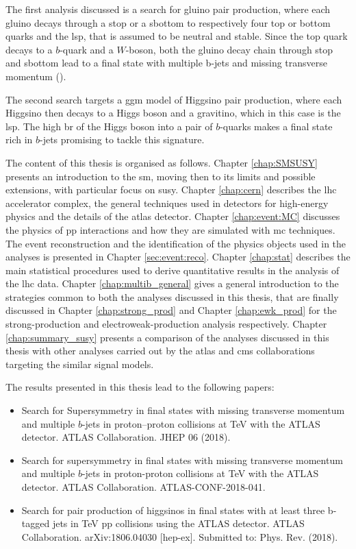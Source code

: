 The first analysis discussed is a search for gluino pair production, where each gluino decays through a stop or a sbottom 
to respectively four top or bottom quarks and the \gls{lsp}, that is assumed to be neutral and stable.
Since the top quark decays to a $b$-quark and a $W$-boson, both the gluino decay chain through stop and sbottom lead to a 
final state with multiple b-jets and missing transverse momentum (\met). 

The second search targets a \gls{ggm} model of Higgsino pair production, where each Higgsino then decays to a Higgs boson and 
a gravitino, which in this case is the \gls{lsp}. The high \gls{br} of the Higgs boson into a pair of $b$-quarks makes a final state 
rich in $b$-jets promising to tackle this signature.

The content of this thesis is organised as follows. Chapter \ref{chap:SMSUSY} presents an introduction to the \gls{sm}, 
moving then to its limits and possible extensions, with particular focus on \gls{susy}. 
Chapter \ref{chap:cern} describes the \gls{lhc} accelerator complex, the general techniques used in detectors 
for high-energy physics and the details of the \gls{atlas} detector. 
Chapter \ref{chap:event:MC} discusses the physics of \gls{pp} interactions and how they are simulated with \gls{mc} techniques. 
The event reconstruction and the identification of the physics objects used in the analyses is presented in Chapter \ref{sec:event:reco}. 
Chapter \ref{chap:stat} describes the main statistical procedures used to derive quantitative results in the analysis of the \gls{lhc} data.
Chapter \ref{chap:multib_general} gives a general introduction to the strategies common to both the analyses discussed in this thesis, 
that are finally discussed in Chapter \ref{chap:strong_prod} and Chapter \ref{chap:ewk_prod} for the strong-production and 
electroweak-production analysis respectively. 
Chapter \ref{chap:summary_susy} presents a comparison of the analyses discussed in this thesis with other analyses carried out 
by the \gls{atlas} and \gls{cms} collaborations targeting the similar signal models. 

The results presented in this thesis lead to the following papers:

\begin{itemize}
\item Search for Supersymmetry in final states with missing transverse momentum and multiple $b$-jets in proton–proton collisions at \cmtre TeV with the ATLAS detector. ATLAS Collaboration. JHEP 06 (2018). 
\item Search for supersymmetry in final states with missing transverse momentum and multiple $b$-jets in proton-proton collisions at \cmtre TeV with the ATLAS detector. ATLAS Collaboration. ATLAS-CONF-2018-041.
\item Search for pair production of higgsinos in final states with at least three b-tagged jets in \cmtre TeV pp collisions using the ATLAS detector. 
ATLAS Collaboration. arXiv:1806.04030 [hep-ex]. 
Submitted to: Phys. Rev. (2018).
\end{itemize}

